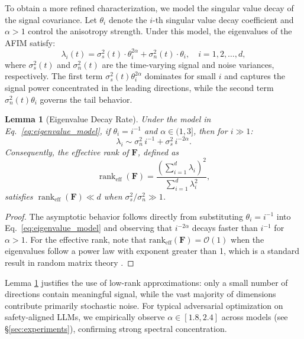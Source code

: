 \documentclass[preprint,12pt]{elsarticle}
\newtheorem{lemma}{Lemma}[section]
\begin{document}
To obtain a more refined characterization, we model the singular value decay of the signal covariance. Let $\theta_i$ denote the $i$-th singular value decay coefficient and $\alpha > 1$ control the anisotropy strength. Under this model, the eigenvalues of the AFIM satisfy:
\begin{equation}
\label{eq:eigenvalue_model}
\lambda_i(t) = \sigma_s^2(t) \cdot \theta_i^{2\alpha} + \sigma_n^2(t) \cdot \theta_i,
\quad i = 1, 2, \ldots, d,
\end{equation}
where $\sigma_s^2(t)$ and $\sigma_n^2(t)$ are the time-varying signal and noise variances, respectively. The first term $\sigma_s^2(t) \theta_i^{2\alpha}$ dominates for small $i$ and captures the signal power concentrated in the leading directions, while the second term $\sigma_n^2(t) \theta_i$ governs the tail behavior.

\begin{lemma}[Eigenvalue Decay Rate]
\label{lem:decay_rate}
Under the model in Eq.~\eqref{eq:eigenvalue_model}, if $\theta_i = i^{-1}$ and $\alpha \in (1, 3]$, then for $i \gg 1$:
\begin{equation}
\lambda_i \sim \sigma_n^2 \, i^{-1} + \sigma_s^2 \, i^{-2\alpha}.
\end{equation}
Consequently, the effective rank of $\mathbf{F}$, defined as
\begin{equation}
\label{eq:eff_rank}
\operatorname{rank}_{\text{eff}}(\mathbf{F}) = \frac{\left(\sum_{i=1}^{d} \lambda_i\right)^2}{\sum_{i=1}^{d} \lambda_i^2},
\end{equation}
satisfies $\operatorname{rank}_{\text{eff}}(\mathbf{F}) \ll d$ when $\sigma_s^2 / \sigma_n^2 \gg 1$.
\end{lemma}

\begin{proof}
The asymptotic behavior follows directly from substituting $\theta_i = i^{-1}$ into Eq.~\eqref{eq:eigenvalue_model} and observing that $i^{-2\alpha}$ decays faster than $i^{-1}$ for $\alpha > 1$. For the effective rank, note that $\text{rank}_{\text{eff}}(\mathbf{F}) = \mathcal{O}(1)$ when the eigenvalues follow a power law with exponent greater than 1, which is a standard result in random matrix theory \cite{vershynin2018high}.
\end{proof}

Lemma \ref{lem:decay_rate} justifies the use of low-rank approximations: only a small number of directions contain meaningful signal, while the vast majority of dimensions contribute primarily stochastic noise. For typical adversarial optimization on safety-aligned LLMs, we empirically observe $\alpha \in [1.8, 2.4]$ across models (see \S\ref{sec:experiments}), confirming strong spectral concentration.
\end{document}
